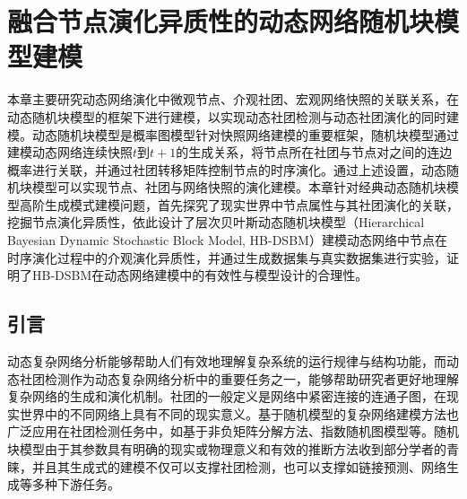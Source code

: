 \baselineskip 20pt

\chapter{融合节点演化异质性的动态网络随机块模型建模} 
\label{chap:3}
本章主要研究动态网络演化中微观节点、介观社团、宏观网络快照的关联关系，在动态随机块模型的框架下进行建模，以实现动态社团检测与动态社团演化的同时建模。动态随机块模型是概率图模型针对快照网络建模的重要框架，随机块模型通过建模动态网络连续快照$t$到$t+1$的生成关系，将节点所在社团与节点对之间的连边概率进行关联，并通过社团转移矩阵控制节点的时序演化。通过上述设置，动态随机块模型可以实现节点、社团与网络快照的演化建模。本章针对经典动态随机块模型高阶生成模式建模问题，首先探究了现实世界中节点属性与其社团演化的关联，挖掘节点演化异质性，依此设计了层次贝叶斯动态随机块模型（Hierarchical Bayesian Dynamic Stochastic Block Model, HB-DSBM）建模动态网络中节点在时序演化过程中的介观演化异质性，并通过生成数据集与真实数据集进行实验，证明了HB-DSBM在动态网络建模中的有效性与模型设计的合理性。
\section{引言}
动态复杂网络分析能够帮助人们有效地理解复杂系统的运行规律与结构功能\cite{papadopoulos2012popularity}，而动态社团检测作为动态复杂网络分析中的重要任务之一，能够帮助研究者更好地理解复杂网络的生成和演化机制\cite{martinet2020robust}。社团的一般定义是网络中紧密连接的连通子图，在现实世界中的不同网络上具有不同的现实意义\cite{jin2021survey}。基于随机模型的复杂网络建模方法也广泛应用在社团检测任务中，如基于非负矩阵分解方法、指数随机图模型等。随机块模型由于其参数具有明确的现实或物理意义和有效的推断方法收到部分学者的青睐，并且其生成式的建模不仅可以支撑社团检测，也可以支撑如链接预测\cite{kumar2024community}、网络生成\cite{dreveton2024exact}等多种下游任务。

